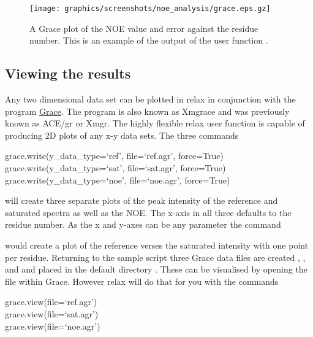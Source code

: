 
\begin{figure}
\centerline{\texttt{[image: graphics/screenshots/noe\_analysis/grace.eps.gz]}}
\caption[NOE plot]{A Grace plot of the NOE value and error against the residue number.  This is an example of the output of the user function .}\label{fig: NOE plot}
\end{figure}


\subsection{Viewing the results}

Any two dimensional data set can be plotted in relax in conjunction with the program \href{http://plasma-gate.weizmann.ac.il/Grace/}{Grace}.  The program is also known as Xmgrace and was previously known as ACE/gr or Xmgr.  The highly flexible relax user function  is capable of producing 2D plots of any x-y data sets.  The three commands

\begin{exampleenv}
grace.write(y\_data\_type=`ref', file=`ref.agr', force=True) \\
grace.write(y\_data\_type=`sat', file=`sat.agr', force=True) \\
grace.write(y\_data\_type=`noe', file=`noe.agr', force=True)
\end{exampleenv}

will create three separate plots of the peak intensity of the reference and saturated spectra as well as the NOE.  The x-axis in all three defaults to the residue number.  As the x and y-axes can be any parameter the command


would create a plot of the reference verses the saturated intensity with one point per residue.  Returning to the sample script three Grace data files are created , , and  and placed in the default directory .  These can be visualised by opening the file within Grace.  However relax will do that for you with the commands

\begin{exampleenv}
grace.view(file=`ref.agr') \\
grace.view(file=`sat.agr') \\
grace.view(file=`noe.agr')
\end{exampleenv}

